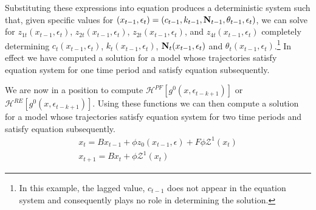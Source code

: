 \documentclass[12pt]{article}
\begin{document}
Substituting  these expressions into equation  produces
a deterministic system such that, given specific values for 
$(x_{t-1},\epsilon_{t})=(c_{t-1}, k_{t-1},{\mathbf{N}}_{t-1}, \theta_{t-1}, \epsilon_t)$, we can solve for $z_{1t}(x_{t-1},\epsilon_{t})$, $z_{2t}(x_{t-1},\epsilon_{t})$, $z_{2t}(x_{t-1},\epsilon_{t})$, and $z_{4t}(x_{t-1},\epsilon_{t})$  completely determining
$c_{t}(x_{t-1},\epsilon_{t})$, $k_{t}(x_{t-1},\epsilon_{t})$, ${\mathbf{N}}_{t}(x_{t-1},\epsilon_{t})$  and $\theta_{t}(x_{t-1},\epsilon_{t})$.\footnote{In this example, the lagged value,  $c_{t-1}$ does not appear in the equation system and consequently plays no role in determining the solution.}  In effect we have 
computed a solution for a model whose trajectories satisfy equation system 
for one time period and satisfy equation  subsequently.









We are now in a position to compute
$\mathcal{H}^{PF}[g^{0}(x,\epsilon_{t-k+1})]$ or
$\mathcal{H}^{RE}[g^{0}(x,\epsilon_{t-k+1})]$.
Using these functions we can then compute a solution for a model whose trajectories satisfy equation system 
for two time periods and satisfy equation  subsequently.
\begin{gather}
  \label{eq:1}
  x_t=B x_{t-1} + \phi z_0(x_{t-1},\epsilon) + F \phi \mathcal{Z}^1(x_t)\\
  x_{t+1}=B x_{t} + \phi \mathcal{Z}^1(x_t)
\end{gather}
\end{document}
